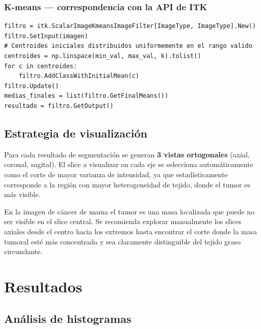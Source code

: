 \documentclass[12pt, a4paper]{article}
\begin{document}
\subsubsection{K-means — correspondencia con la API de ITK}

\begin{lstlisting}[caption={Aplicación del ScalarImageKmeansImageFilter}]
filtro = itk.ScalarImageKmeansImageFilter[ImageType, ImageType].New()
filtro.SetInput(imagen)
# Centroides iniciales distribuidos uniformemente en el rango valido
centroides = np.linspace(min_val, max_val, k).tolist()
for c in centroides:
    filtro.AddClassWithInitialMean(c)
filtro.Update()
medias_finales = list(filtro.GetFinalMeans())
resultado = filtro.GetOutput()
\end{lstlisting}

\subsection{Estrategia de visualización}

Para cada resultado de segmentación se generan \textbf{3 vistas ortogonales} (axial,
coronal, sagital). El slice a visualizar en cada eje se selecciona automáticamente como
el corte de mayor varianza de intensidad, ya que estadísticamente corresponde a la región
con mayor heterogeneidad de tejido, donde el tumor es más visible.

\begin{tcolorbox}[warnstyle, title={Nota especial — Cáncer de mama}]
En la imagen de cáncer de mama el tumor es una masa localizada que puede no ser visible
en el slice central. Se recomienda explorar manualmente los slices axiales desde el
centro hacia los extremos hasta encontrar el corte donde la masa tumoral esté más
concentrada y sea claramente distinguible del tejido graso circundante.
\end{tcolorbox}

\section{Resultados}

\subsection{Análisis de histogramas}
\end{document}

